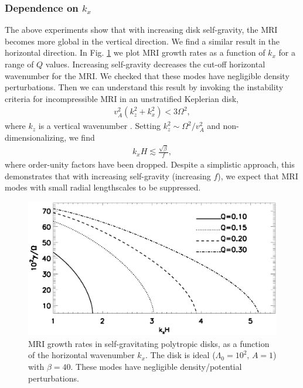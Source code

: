 \subsubsection{Dependence on $k_x$}
The above experiments show that with increasing 
disk self-gravity, the MRI becomes more global in the vertical
direction. We find a similar result in the horizontal direction. 
In Fig. \ref{compare_growth_poly_kx} we plot MRI growth rates as a
function of $k_x$ for a range of $Q$ values. Increasing self-gravity
decreases the cut-off horizontal wavenumber for the MRI. We checked
that these modes have negligible density perturbations. Then we can 
understand this result by invoking the instability criteria for  
incompressible MRI in an unstratified Keplerian disk,
\begin{align}
  v_A^2(k_z^2 + k_x^2) < 3\Omega^2,
\end{align}
where $k_z$ is a vertical wavenumber \citep{kim00}. Setting $k_z^2\sim
\Omega^2/v_A^2$ and non-dimensionalizing, we find
\begin{align} 
  k_xH \lesssim \frac{\sqrt{\beta}}{f},
\end{align}
where order-unity factors have been dropped. Despite a simplistic
approach, this demonstrates that with increasing self-gravity
(increasing $f$), we expect that MRI modes with small radial
lengthscales to be suppressed.   

 
\begin{figure}
  \includegraphics[width=\linewidth]{figures/compare_growth_poly_varQ_kx}
  \caption{MRI growth rates in self-gravitating polytropic disks, as a
    function of the horizontal wavenumber $k_x$. The disk is ideal
    ($\Lambda_0=10^2,\, A=1$) with $\beta = 40$. These modes have negligible
    density/potential perturbations.  
    \label{compare_growth_poly_kx}}
\end{figure}


